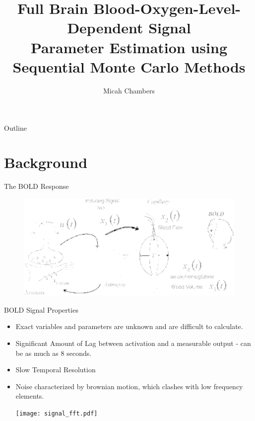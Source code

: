 \documentclass{beamer}
\title{Full Brain Blood-Oxygen-Level-Dependent Signal \\
Parameter Estimation using Sequential Monte Carlo Methods}
\author{Micah Chambers}
\institute{Virginia Tech Bioimaging Systems Lab}
\begin{document}
\begin{frame}
  \titlepage
\end{frame}

\begin{frame}{Outline}
  \tableofcontents
\end{frame}

\section{Background}
\begin{frame}{The BOLD Response}
\begin{figure}
\includegraphics[scale=.23]{model}
\caption{
    \tiny
    \cite{nonlinearfiltering}
}
\end{figure}
\end{frame}

\begin{frame}{BOLD Signal Properties}
  \begin{itemize}
    \item Exact variables and parameters are unknown and are
        difficult to calculate.
    \item Significant Amount of Lag between activation
        and a measurable output - can be as much as 8 seconds.
    \item Slow Temporal Resolution
    \item Noise characterized by brownian motion, which clashes with low 
        frequency elements.
    \begin{center}
    \texttt{[image: signal\_fft.pdf]}
    \end{center}
  \end{itemize}
\end{frame}
\end{document}
